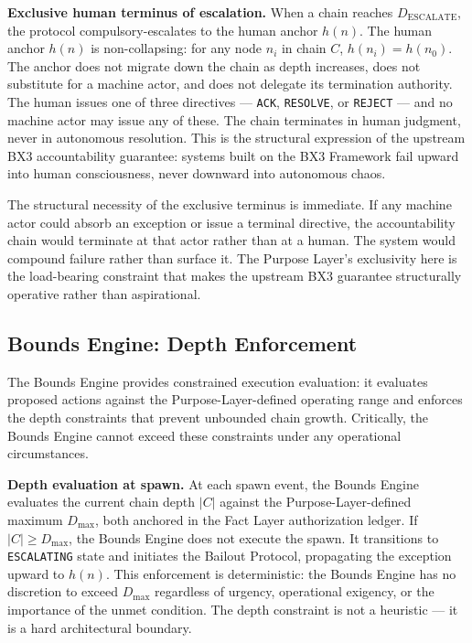 \medskip
\noindent\textbf{Exclusive human terminus of escalation.} When a chain reaches $D_{\mathrm{ESCALATE}}$, the protocol compulsory-escalates to the human anchor $h(n)$. The human anchor $h(n)$ is non-collapsing: for any node $n_i$ in chain $C$, $h(n_i) = h(n_0)$. The anchor does not migrate down the chain as depth increases, does not substitute for a machine actor, and does not delegate its termination authority. The human issues one of three directives — \texttt{ACK}, \texttt{RESOLVE}, or \texttt{REJECT} — and no machine actor may issue any of these. The chain terminates in human judgment, never in autonomous resolution. This is the structural expression of the upstream BX3 accountability guarantee: systems built on the BX3 Framework fail upward into human consciousness, never downward into autonomous chaos.

The structural necessity of the exclusive terminus is immediate. If any machine actor could absorb an exception or issue a terminal directive, the accountability chain would terminate at that actor rather than at a human. The system would compound failure rather than surface it. The Purpose Layer's exclusivity here is the load-bearing constraint that makes the upstream BX3 guarantee structurally operative rather than aspirational.

\subsection{Bounds Engine: Depth Enforcement}
\label{sec:rs-bounds-depth}

The Bounds Engine provides constrained execution evaluation: it evaluates proposed actions against the Purpose-Layer-defined operating range and enforces the depth constraints that prevent unbounded chain growth. Critically, the Bounds Engine cannot exceed these constraints under any operational circumstances.

\medskip
\noindent\textbf{Depth evaluation at spawn.} At each spawn event, the Bounds Engine evaluates the current chain depth $|C|$ against the Purpose-Layer-defined maximum $D_{\mathrm{max}}$, both anchored in the Fact Layer authorization ledger. If $|C| \geq D_{\mathrm{max}}$, the Bounds Engine does not execute the spawn. It transitions to \texttt{ESCALATING} state and initiates the Bailout Protocol, propagating the exception upward to $h(n)$. This enforcement is deterministic: the Bounds Engine has no discretion to exceed $D_{\mathrm{max}}$ regardless of urgency, operational exigency, or the importance of the unmet condition. The depth constraint is not a heuristic — it is a hard architectural boundary.

